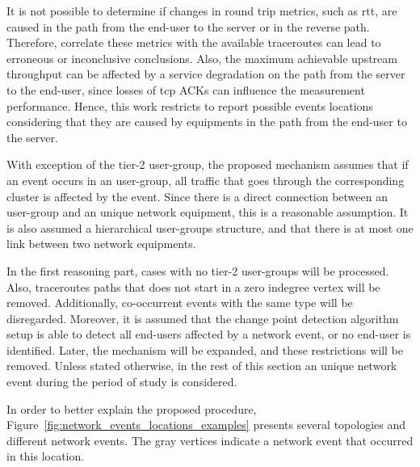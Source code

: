 It is not possible to determine if changes in round trip metrics, such as
\gls*{rtt},
are caused in the path from the end-user to the server or in the reverse path.
Therefore, correlate these metrics with the available traceroutes can lead to
erroneous or inconclusive conclusions. Also, the maximum achievable upstream
throughput can be affected by a service degradation on the path from the server
to the end-user, since losses of \gls*{tcp} ACKs can influence the measurement
performance.
Hence, this work restricts to report possible events locations considering that
they are caused by equipments in the path from the end-user to the server.

With exception of the tier-2 user-group, the proposed mechanism assumes that
if an event occurs in an user-group,
all traffic that goes through the corresponding cluster is affected by the
event. Since
there is a direct connection between an user-group and an unique network
equipment, this is a reasonable assumption.
It is also assumed a hierarchical user-groups structure, and that there is at most
one link between two network equipments.

In the first reasoning part, cases with no tier-2 user-groups will be processed.
Also,
traceroutes paths that does not start in a zero indegree vertex will be removed.
Additionally, co-occurrent events with the same type will be disregarded.
Moreover, it is assumed that the
change point detection algorithm setup is able to detect all end-users
affected by a network event, or no end-user is identified.
Later, the mechanism will be expanded, and these restrictions will be removed.
Unless stated otherwise, in the rest of this section an
unique network event during the period of study is considered.

In order to better explain the proposed procedure,
Figure~\ref{fig:network_events_locations_examples} presents several topologies
and different network events. The gray vertices indicate a network event
that occurred in this location.

